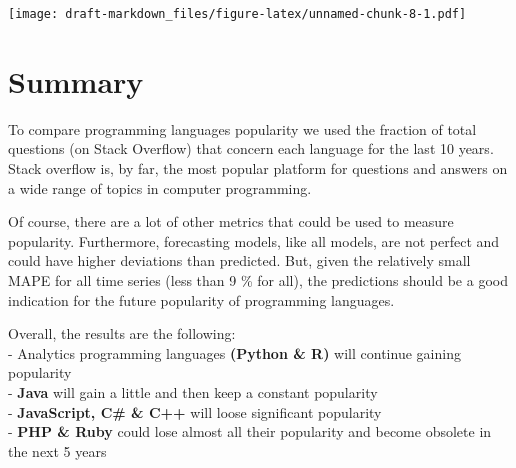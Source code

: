 \documentclass[
]{article}
\begin{document}
\texttt{[image: draft-markdown\_files/figure-latex/unnamed-chunk-8-1.pdf]}

\hypertarget{summary}{%
\section{Summary}\label{summary}}

To compare programming languages popularity we used the fraction of
total questions (on Stack Overflow) that concern each language for the
last 10 years. Stack overflow is, by far, the most popular platform for
questions and answers on a wide range of topics in computer programming.

Of course, there are a lot of other metrics that could be used to
measure popularity. Furthermore, forecasting models, like all models,
are not perfect and could have higher deviations than predicted. But,
given the relatively small MAPE for all time series (less than 9 \% for
all), the predictions should be a good indication for the future
popularity of programming languages.

Overall, the results are the following:\\
- Analytics programming languages \textbf{(Python \& R)} will continue
gaining popularity\\
- \textbf{Java} will gain a little and then keep a constant popularity\\
- \textbf{JavaScript, C\# \& C++} will loose significant popularity\\
- \textbf{PHP \& Ruby} could lose almost all their popularity and become
obsolete in the next 5 years
\end{document}
